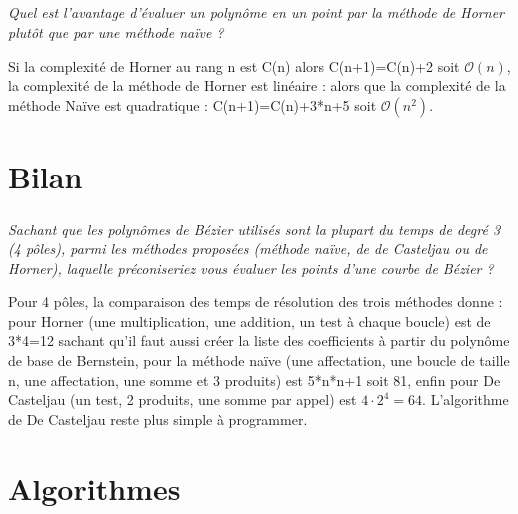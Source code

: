 \documentclass[10pt,fleqn]{article} %
\begin{document}
\subparagraph{}
\textit{Quel  est l'avantage d'évaluer un polynôme en un point par la méthode de Horner plutôt que par une méthode naïve ?}
\ifprof
\begin{corrige}
Si la complexité de Horner au rang n est C(n) alors C(n+1)=C(n)+2 soit $\mathcal{O}\left(n\right)$, la complexité de la méthode de Horner est linéaire : 
alors que la complexité de la méthode Naïve est quadratique : C(n+1)=C(n)+3*n+5 soit $\mathcal{O}\left(n^2\right)$.
\end{corrige}
\else
\fi

\section{Bilan}
\subparagraph{}
\textit{Sachant que les polynômes de Bézier utilisés sont la plupart du temps de degré 3 (4 pôles), parmi les méthodes proposées (méthode naïve, de de Casteljau ou de Horner), laquelle préconiseriez vous évaluer les points d'une courbe de Bézier ?}

\ifprof
\begin{corrige}
Pour 4 pôles, la comparaison des temps de résolution des trois méthodes donne : pour Horner (une multiplication, une addition, un test à chaque boucle) est de 3*4=12 sachant qu'il faut aussi créer la liste des coefficients à partir du polynôme de base de Bernstein, pour la méthode naïve (une affectation, une boucle de taille n, une affectation, une somme et 3 produits) est 5*n*n+1 soit 81, enfin pour De Casteljau (un test, 2 produits, une somme par appel) est $4\cdot 2^4=64$.
L'algorithme de De Casteljau reste plus simple à programmer.
\end{corrige}
\else
\fi
\ifprof
\else
\newpage


\section*{Algorithmes}
\end{document}

